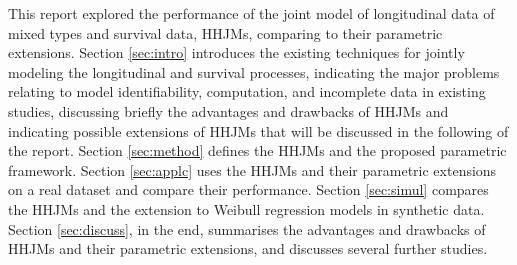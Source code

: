 This report explored the performance of the joint model of longitudinal data of mixed types and survival data, HHJMs, comparing to their parametric extensions. Section \ref{sec:intro} introduces the existing techniques for jointly modeling the longitudinal and survival processes, indicating the major problems relating to model identifiability, computation, and incomplete data in existing studies, discussing briefly the advantages and drawbacks of HHJMs and indicating possible extensions of HHJMs that will be discussed in the following of the report. Section \ref{sec:method} defines the HHJMs and the proposed parametric framework. Section \ref{sec:applc} uses the HHJMs and their parametric extensions on a real dataset and compare their performance. Section \ref{sec:simul} compares the HHJMs and the extension to Weibull regression models in synthetic data. Section \ref{sec:discuss}, in the end, summarises the advantages and drawbacks of HHJMs and their parametric extensions, and discusses several further studies.

